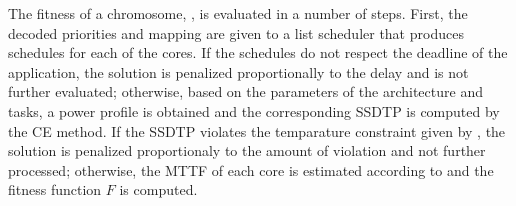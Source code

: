 The fitness of a chromosome, , is evaluated in a number of steps. First, the decoded priorities and mapping are given to a list scheduler that produces schedules for each of the cores. If the schedules do not respect the deadline of the application, the solution is penalized proportionally to the delay and is not further evaluated; otherwise, based on the parameters of the architecture and tasks, a power profile is obtained and the corresponding SSDTP is computed by the CE method. If the SSDTP violates the temparature constraint given by , the solution is penalized proportionaly to the amount of violation and not further processed; otherwise, the MTTF of each core is estimated according to  and the fitness function $F$ is computed.
